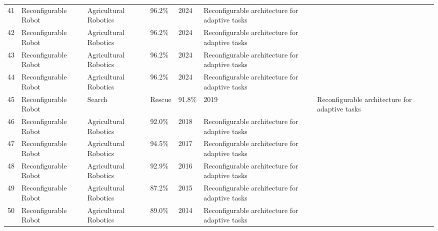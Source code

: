 \begin{table*}[htbp]
\begin{tabular}{p{}p{}p{}p{}p{}p{}p{}}
 41 & Reconfigurable Robot & Agricultural Robotics & 96.2\% & 2024 & Reconfigurable architecture for adaptive tasks & \cite{chen2024design} \\
 42 & Reconfigurable Robot & Agricultural Robotics & 96.2\% & 2024 & Reconfigurable architecture for adaptive tasks & \cite{li2024reconfigurable} \\
 43 & Reconfigurable Robot & Agricultural Robotics & 96.2\% & 2024 & Reconfigurable architecture for adaptive tasks & \cite{wang2024design} \\
 44 & Reconfigurable Robot & Agricultural Robotics & 96.2\% & 2024 & Reconfigurable architecture for adaptive tasks & \cite{zhang2024reconfigurable} \\
 45 & Reconfigurable Robot & Search & Rescue & 91.8\% & 2019 & Reconfigurable architecture for adaptive tasks & \cite{Wang2019} \\
 46 & Reconfigurable Robot & Agricultural Robotics & 92.0\% & 2018 & Reconfigurable architecture for adaptive tasks & \cite{Kim2018} \\
 47 & Reconfigurable Robot & Agricultural Robotics & 94.5\% & 2017 & Reconfigurable architecture for adaptive tasks & \cite{Li2017} \\
 48 & Reconfigurable Robot & Agricultural Robotics & 92.9\% & 2016 & Reconfigurable architecture for adaptive tasks & \cite{Chen2016} \\
 49 & Reconfigurable Robot & Agricultural Robotics & 87.2\% & 2015 & Reconfigurable architecture for adaptive tasks & \cite{Zhang2015} \\
 50 & Reconfigurable Robot & Agricultural Robotics & 89.0\% & 2014 & Reconfigurable architecture for adaptive tasks & \cite{Yeo2014} \\
\bottomrule
\end{tabular}
\end{table*}